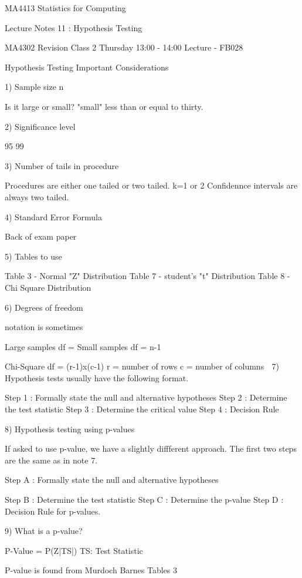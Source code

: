 MA4413 Statistics for Computing
 
Lecture Notes 11 : Hypothesis Testing

MA4302 Revision Class 2
Thursday 13:00 - 14:00 Lecture -   FB028
 
Hypothesis Testing 
Important Considerations
 
1) Sample size n
 
    Is it large or small?        "small" less than or equal to thirty.
 
2) Significance level 
 
    95%
    99%
 
3) Number of tails in procedure
    
    Procedures are either one tailed or two tailed.  k=1 or 2
    Confidennce intervals are always two tailed.
 
4) Standard Error Formula
 
    Back of exam paper
 
5) Tables to use
    
    Table 3 - Normal "Z" Distribution
    Table 7 - student's "t" Distribution
    Table 8 - Chi Square Distribution
 
6) Degrees of freedom
    
    notation is sometimes 
    
    Large samples    df = 
    Small samples    df = n-1
    
    Chi-Square        df = (r-1)x(c-1)
                 r  = number of rows
                 c =  number of columns
              
7) Hypothesis tests usually have the following format.
 
Step 1 : Formally state the null and alternative hypotheses
Step 2 : Determine the test statistic
Step 3 : Determine the critical value
Step 4 : Decision Rule
 
8) Hypothesis testing using p-values
 
If asked to use p-value, we have a slightly diffferent approach.
The first two steps are the same as in note 7.
  

Step A : Formally state the null and alternative hypotheses

Step B : Determine the test statistic
Step C : Determine the p-value
Step D : Decision Rule for p-values.
 
9)  What is a p-value?
 
P-Value = P(Z|TS|)   TS: Test Statistic
 
P-value  is found from Murdoch Barnes Tables 3
 
